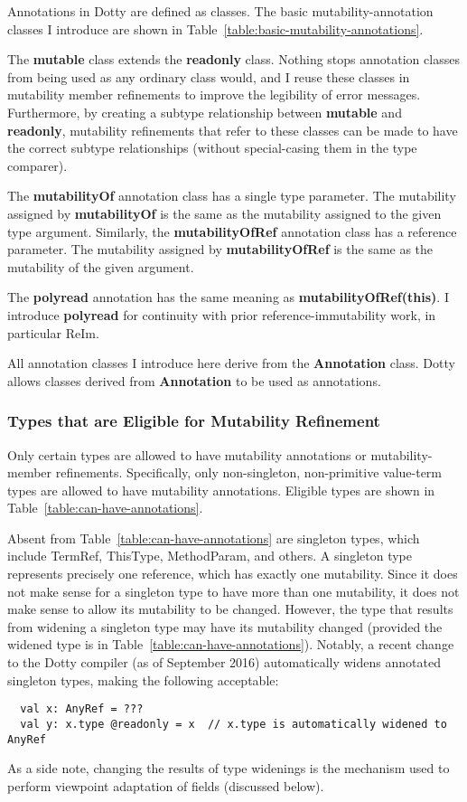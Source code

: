 \documentclass[11pt]{report}
\newcommand{\cdf}{\bf\ttfamily} %
\newcommand{\cd}{\cdf\small}  %
\begin{document}
Annotations in Dotty are defined as classes. The basic mutability-annotation classes I introduce are shown in Table~\ref{table:basic-mutability-annotations}.

The {\cd mutable} class extends the {\cd readonly} class. Nothing stops annotation classes from being used as any ordinary class would, and I reuse these classes in mutability member refinements to improve the legibility of error messages. Furthermore, by creating a subtype relationship between {\cd mutable} and {\cd readonly}, mutability refinements that refer to these classes can be made to have the correct subtype relationships (without special-casing them in the type comparer).

The {\cd mutabilityOf} annotation class has a single type parameter. The mutability assigned by {\cd mutabilityOf} is the same as the mutability assigned to the given type argument. Similarly, the {\cd mutabilityOfRef} annotation class has a reference parameter. The mutability assigned by {\cd mutabilityOfRef} is the same as the mutability of the given argument.

The {\cd polyread} annotation has the same meaning as {\cd mutabilityOfRef(this)}. I introduce {\cd polyread} for continuity with prior reference-immutability work, in particular ReIm.

All annotation classes I introduce here derive from the {\cd Annotation} class. Dotty allows classes derived from {\cd Annotation} to be used as annotations.


\subsubsection{Types that are Eligible for Mutability Refinement}

Only certain types are allowed to have mutability annotations or mutability-member refinements. Specifically, only non-singleton, non-primitive value-term types are allowed to have mutability annotations. Eligible types are shown in Table~\ref{table:can-have-annotations}.

Absent from Table~\ref{table:can-have-annotations} are singleton types, which include TermRef, ThisType, MethodParam, and others. A singleton type represents precisely one reference, which has exactly one mutability. Since it does not make sense for a singleton type to have more than one mutability, it does not make sense to allow its mutability to be changed. However, the type that results from widening a singleton type may have its mutability changed (provided the widened type is in Table~\ref{table:can-have-annotations}). Notably, a recent change to the Dotty compiler (as of September 2016) automatically widens annotated singleton types, making the following acceptable:
\begin{lstlisting}
  val x: AnyRef = ???
  val y: x.type @readonly = x  // x.type is automatically widened to AnyRef
\end{lstlisting}
As a side note, changing the results of type widenings is the mechanism used to perform viewpoint adaptation of fields (discussed below).
\end{document}
